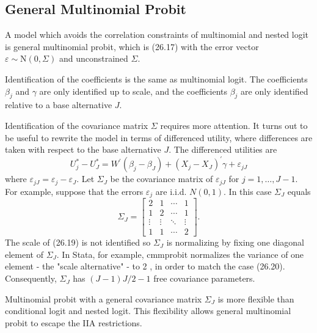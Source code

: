 \documentclass[10pt]{article}
\begin{document}
\subsection{General Multinomial Probit}
A model which avoids the correlation constraints of multinomial and nested logit is general multinomial probit, which is (26.17) with the error vector $\varepsilon \sim \mathrm{N}(0, \Sigma)$ and unconstrained $\Sigma$.

Identification of the coefficients is the same as multinomial logit. The coefficients $\beta_{j}$ and $\gamma$ are only identified up to scale, and the coefficients $\beta_{j}$ are only identified relative to a base alternative $J$.

Identification of the covariance matrix $\Sigma$ requires more attention. It turns out to be useful to rewrite the model in terms of differenced utility, where differences are taken with respect to the base alternative $J$. The differenced utilities are
$$
U_{j}^{*}-U_{J}^{*}=W^{\prime}\left(\beta_{j}-\beta_{J}\right)+\left(X_{j}-X_{J}\right)^{\prime} \gamma+\varepsilon_{j J}
$$
where $\varepsilon_{j J}=\varepsilon_{j}-\varepsilon_{J}$. Let $\Sigma_{J}$ be the covariance matrix of $\varepsilon_{j J}$ for $j=1, \ldots, J-1$. For example, suppose that the errors $\varepsilon_{j}$ are i.i.d. $N(0,1)$. In this case $\Sigma_{J}$ equals
$$
\Sigma_{J}=\left[\begin{array}{cccc}
2 & 1 & \cdots & 1 \\
1 & 2 & \cdots & 1 \\
\vdots & \vdots & \ddots & \vdots \\
1 & 1 & \cdots & 2
\end{array}\right] .
$$
The scale of (26.19) is not identified so $\Sigma_{J}$ is normalizing by fixing one diagonal element of $\Sigma_{J}$. In Stata, for example, cmmprobit normalizes the variance of one element - the "scale alternative" - to 2 , in order to match the case (26.20). Consequently, $\Sigma_{J}$ has $(J-1) J / 2-1$ free covariance parameters.

Multinomial probit with a general covariance matrix $\Sigma_{J}$ is more flexible than conditional logit and nested logit. This flexibility allows general multinomial probit to escape the IIA restrictions.
\end{document}
